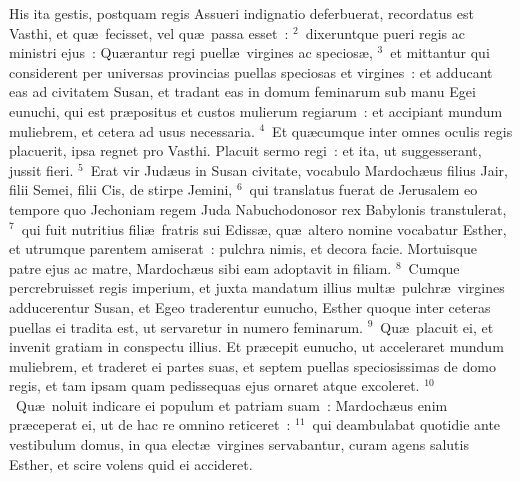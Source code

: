 \lettrine[lines=10,image=true,loversize=0.05,lraise=-0.03]{H}{}is ita gestis, postquam regis Assueri indignatio deferbuerat, recordatus est Vasthi, et qu\ae\ fecisset, vel qu\ae\ passa esset~:
${}^{2}$~dixeruntque pueri regis ac ministri ejus~: Qu\ae rantur regi puell\ae\ virgines ac specios\ae ,
${}^{3}$~et mittantur qui considerent per universas provincias puellas speciosas et virgines~: et adducant eas ad civitatem Susan, et tradant eas in domum feminarum sub manu Egei eunuchi, qui est pr\ae positus et custos mulierum regiarum~: et accipiant mundum muliebrem, et cetera ad usus necessaria.
${}^{4}$~Et qu\ae cumque inter omnes oculis regis placuerit, ipsa regnet pro Vasthi. Placuit sermo regi~: et ita, ut suggesserant, jussit fieri.
${}^{5}$~Erat vir Jud\ae us in Susan civitate, vocabulo Mardoch\ae us filius Jair, filii Semei, filii Cis, de stirpe Jemini,
${}^{6}$~qui translatus fuerat de Jerusalem eo tempore quo Jechoniam regem Juda Nabuchodonosor rex Babylonis transtulerat,
${}^{7}$~qui fuit nutritius fili\ae\ fratris sui Ediss\ae , qu\ae\ altero nomine vocabatur Esther, et utrumque parentem amiserat~: pulchra nimis, et decora facie. Mortuisque patre ejus ac matre, Mardoch\ae us sibi eam adoptavit in filiam.
${}^{8}$~Cumque percrebruisset regis imperium, et juxta mandatum illius mult\ae\ pulchr\ae\ virgines adducerentur Susan, et Egeo traderentur eunucho, Esther quoque inter ceteras puellas ei tradita est, ut servaretur in numero feminarum.
${}^{9}$~Qu\ae\ placuit ei, et invenit gratiam in conspectu illius. Et pr\ae cepit eunucho, ut acceleraret mundum muliebrem, et traderet ei partes suas, et septem puellas speciosissimas de domo regis, et tam ipsam quam pedissequas ejus ornaret atque excoleret.
${}^{10}$~Qu\ae\ noluit indicare ei populum et patriam suam~: Mardoch\ae us enim pr\ae ceperat ei, ut de hac re omnino reticeret~:
${}^{11}$~qui deambulabat quotidie ante vestibulum domus, in qua elect\ae\ virgines servabantur, curam agens salutis Esther, et scire volens quid ei accideret.


